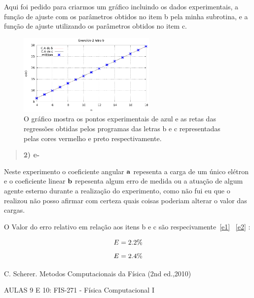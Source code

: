 \documentclass[a4wide]{report}
\begin{document}
Aqui foi pedido para criarmos um gráfico incluindo os dados experimentais, a função de ajuste com os parâmetros obtidos
no item b pela minha subrotina, e a função de ajuste utilizando os parâmetros obtidos no item c.

\begin{figure}[h]
\centering
\includegraphics[width=0.6\textwidth]{ex02d}
\caption{O gráfico mostra os pontos experimentais de azul e as retas das regressões obtidas pelos programas das letras b e c 
representadas pelas cores vermelho e preto respectivamente.}
\label{graficoex02d}
\end{figure}

\begin{quote}

\bf 2) e-

\end{quote}


Neste experimento o coeficiente angular ${\bf a}$ repesenta a carga de um único elétron e o coeficiente
linear ${\bf b}$ repesenta algum erro de medida ou a atuação de algum agente esterno durante a realização do
experimento, como não fui eu que o realizou não posso afirmar com certeza quais coisas poderiam alterar o valor das cargas.

O Valor do erro relativo em relação aos itens b e c são respecivamente~\ref{e1} ~\ref{e2} :

\begin{equation}
\centering
 E =   2.2 \%   
\label{e1}
\end{equation}
\begin{equation}
\centering
 E =   2.4 \%   
\label{e2}
\end{equation}



\begin{thebibliography}{99}

 C. Scherer. Metodos Computacionais da Física (2nd ed.,2010)

 AULAS 9 E 10: FIS-271 - Física Computacional I

\end{thebibliography}
\end{document}
